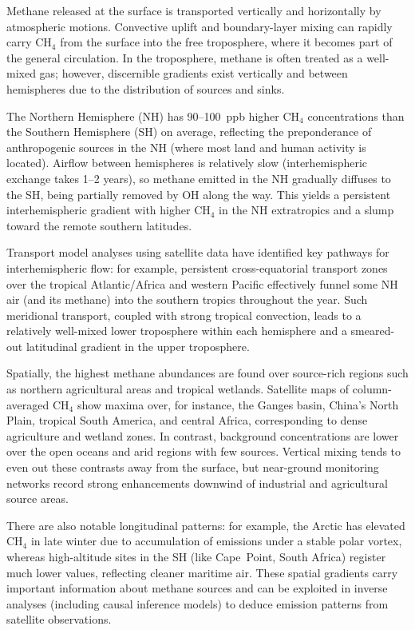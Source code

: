Methane released at the surface is transported vertically and horizontally by atmospheric motions. Convective uplift and boundary-layer mixing can rapidly carry CH$_4$ from the surface into the free troposphere, where it becomes part of the general circulation. In the troposphere, methane is often treated as a well-mixed gas; however, discernible gradients exist vertically and between hemispheres due to the distribution of sources and sinks.

The Northern Hemisphere (NH) has 90--100~ppb higher CH$_4$ concentrations than the Southern Hemisphere (SH) on average, reflecting the preponderance of anthropogenic sources in the NH (where most land and human activity is located). Airflow between hemispheres is relatively slow (interhemispheric exchange takes 1--2 years), so methane emitted in the NH gradually diffuses to the SH, being partially removed by OH along the way. This yields a persistent interhemispheric gradient with higher CH$_4$ in the NH extratropics and a slump toward the remote southern latitudes.

Transport model analyses using satellite data have identified key pathways for interhemispheric flow: for example, persistent cross-equatorial transport zones over the tropical Atlantic/Africa and western Pacific effectively funnel some NH air (and its methane) into the southern tropics throughout the year. Such meridional transport, coupled with strong tropical convection, leads to a relatively well-mixed lower troposphere within each hemisphere and a smeared-out latitudinal gradient in the upper troposphere.

Spatially, the highest methane abundances are found over source-rich regions such as northern agricultural areas and tropical wetlands. Satellite maps of column-averaged CH$_4$ show maxima over, for instance, the Ganges basin, China's North Plain, tropical South America, and central Africa, corresponding to dense agriculture and wetland zones. In contrast, background concentrations are lower over the open oceans and arid regions with few sources. Vertical mixing tends to even out these contrasts away from the surface, but near-ground monitoring networks record strong enhancements downwind of industrial and agricultural source areas.

There are also notable longitudinal patterns: for example, the Arctic has elevated CH$_4$ in late winter due to accumulation of emissions under a stable polar vortex, whereas high-altitude sites in the SH (like Cape~Point, South Africa) register much lower values, reflecting cleaner maritime air. These spatial gradients carry important information about methane sources and can be exploited in inverse analyses (including causal inference models) to deduce emission patterns from satellite observations.


